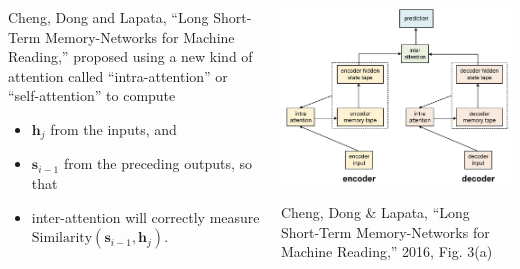 \documentclass{beamer}
\begin{document}
\begin{frame}
  \begin{columns}
    \begin{column}{0.4\textwidth}
      Cheng, Dong and Lapata, ``Long Short-Term Memory-Networks for
      Machine Reading,'' proposed using a new kind of attention called
      ``intra-attention'' or ``self-attention'' to compute
      \begin{itemize}
      \item $\bm{h}_j$ from the inputs, and
      \item $\bm{s}_{i-1}$ from the preceding outputs, so that
      \item inter-attention will correctly measure
        $\mbox{Similarity}(\bm{s}_{i-1},\bm{h}_j)$.
      \end{itemize}
    \end{column}
    \begin{column}{0.6\textwidth}
      \begin{center}
        \includegraphics[width=\textwidth]{figs/cheng2016fig3a.png}

        \begin{tiny}
          Cheng, Dong \& Lapata, ``Long Short-Term Memory-Networks for
          Machine Reading,'' 2016, Fig. 3(a)
        \end{tiny}
      \end{center}
    \end{column}
  \end{columns}
\end{frame}
\end{document}
